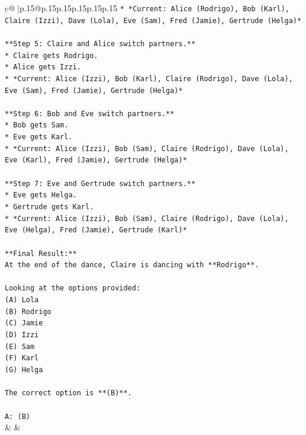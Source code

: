 \documentclass{article}
\begin{document}
{\begin{supertabular}{c@{$\;$}|p{.15\linewidth}@{}p{.15\linewidth}p{.15\linewidth}p{.15\linewidth}p{.15\linewidth}p{.15\linewidth}}
{{{\texttt{*   *Current: Alice (Rodrigo), Bob (Karl), Claire (Izzi), Dave (Lola), Eve (Sam), Fred (Jamie), Gertrude (Helga)*} \\
\\ 
\texttt{**Step 5: Claire and Alice switch partners.**} \\
\texttt{*   Claire gets Rodrigo.} \\
\texttt{*   Alice gets Izzi.} \\
\texttt{*   *Current: Alice (Izzi), Bob (Karl), Claire (Rodrigo), Dave (Lola), Eve (Sam), Fred (Jamie), Gertrude (Helga)*} \\
\\ 
\texttt{**Step 6: Bob and Eve switch partners.**} \\
\texttt{*   Bob gets Sam.} \\
\texttt{*   Eve gets Karl.} \\
\texttt{*   *Current: Alice (Izzi), Bob (Sam), Claire (Rodrigo), Dave (Lola), Eve (Karl), Fred (Jamie), Gertrude (Helga)*} \\
\\ 
\texttt{**Step 7: Eve and Gertrude switch partners.**} \\
\texttt{*   Eve gets Helga.} \\
\texttt{*   Gertrude gets Karl.} \\
\texttt{*   *Current: Alice (Izzi), Bob (Sam), Claire (Rodrigo), Dave (Lola), Eve (Helga), Fred (Jamie), Gertrude (Karl)*} \\
\\ 
\texttt{**Final Result:**} \\
\texttt{At the end of the dance, Claire is dancing with **Rodrigo**.} \\
\\ 
\texttt{Looking at the options provided:} \\
\texttt{(A) Lola} \\
\texttt{(B) Rodrigo} \\
\texttt{(C) Jamie} \\
\texttt{(D) Izzi} \\
\texttt{(E) Sam} \\
\texttt{(F) Karl} \\
\texttt{(G) Helga} \\
\\ 
\texttt{The correct option is **(B)**.} \\
\\ 
\texttt{A: (B)} \\
            }
        }
    }
    & & \\ \\


\end{supertabular}}
\end{document}
